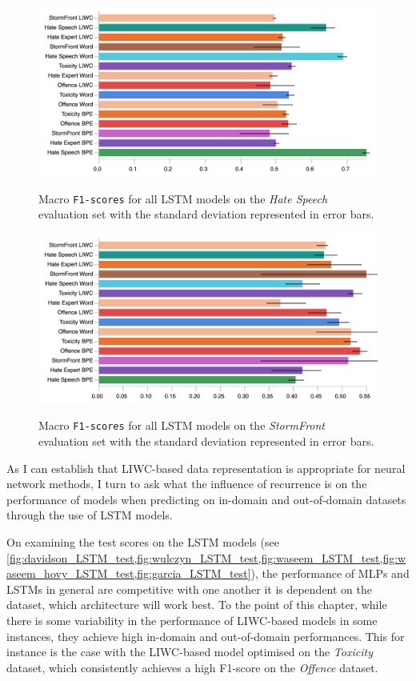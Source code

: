 \begin{figure}
\begin{minipage}{\textwidth}
    \centering
    \includegraphics[width=\textwidth]{all_LSTM_waseem_hovy_test.pdf}
    \caption{Macro \texttt{F1-scores} for all LSTM models on the \textit{Hate Speech} evaluation set with the standard deviation represented in error bars.}
  \label{fig:waseem_hovy_LSTM_test}  
  \vfill
    \includegraphics[width=\textwidth]{all_LSTM_garcia_test.pdf}
  \caption{Macro \texttt{F1-scores} for all LSTM models on the \textit{StormFront} evaluation set with the standard deviation represented in error bars.}
  \label{fig:garcia_LSTM_test}
\end{minipage}
\end{figure}

As I can establish that LIWC-based data representation is appropriate for  neural network methods, I turn to ask what the influence of recurrence is on the performance of models when predicting on in-domain and out-of-domain datasets through the use of LSTM models.

On examining the test scores on the LSTM models (see \cref{fig:davidson_LSTM_test,fig:wulczyn_LSTM_test,fig:waseem_LSTM_test,fig:waseem_hovy_LSTM_test,fig:garcia_LSTM_test}),  the performance of MLPs and LSTMs in general are competitive with one another  it is dependent on the dataset, which  architecture will work best.
To the point of this chapter, while there is some variability in the performance of LIWC-based models in some instances, they achieve high in-domain and out-of-domain performances.
This for instance is the case with the LIWC-based model optimised on the \textit{Toxicity} dataset, which consistently achieves a high F1-score on the \textit{Offence} dataset.

